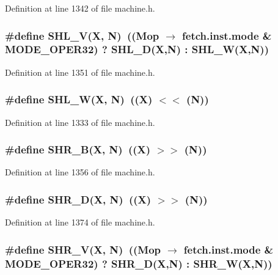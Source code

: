 Definition at line 1342 of file machine.h.
\subsubsection[{SHL\_\-V}]{\setlength{\rightskip}{0pt plus 5cm}\#define SHL\_\-V(X, \/  N)~((Mop $\rightarrow$ fetch.inst.mode \& MODE\_\-OPER32) ? SHL\_\-D(X,N) : SHL\_\-W(X,N))}\label{machine_8h_57dd3b0adf5e6c3acb60cd86bfa50e20}




Definition at line 1351 of file machine.h.
\subsubsection[{SHL\_\-W}]{\setlength{\rightskip}{0pt plus 5cm}\#define SHL\_\-W(X, \/  N)~((X) $<$$<$ (N))}\label{machine_8h_d978aaa7444c84ae22dcf1e2f7026be1}




Definition at line 1333 of file machine.h.
\subsubsection[{SHR\_\-B}]{\setlength{\rightskip}{0pt plus 5cm}\#define SHR\_\-B(X, \/  N)~((X) $>$$>$ (N))}\label{machine_8h_5d2d324b56b77dd73c43fc87d5b4331b}




Definition at line 1356 of file machine.h.
\subsubsection[{SHR\_\-D}]{\setlength{\rightskip}{0pt plus 5cm}\#define SHR\_\-D(X, \/  N)~((X) $>$$>$ (N))}\label{machine_8h_1d97d7c2ceef0bb5cf52dc77c7279781}




Definition at line 1374 of file machine.h.
\subsubsection[{SHR\_\-V}]{\setlength{\rightskip}{0pt plus 5cm}\#define SHR\_\-V(X, \/  N)~((Mop $\rightarrow$ fetch.inst.mode \& MODE\_\-OPER32) ? SHR\_\-D(X,N) : SHR\_\-W(X,N))}\label{machine_8h_8594d84e3984b0e32ba4121eb95e27c2}




